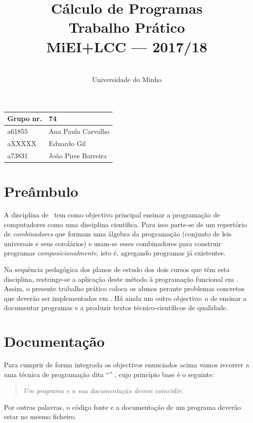 \documentclass[a4paper]{article}
\title{
       	    Cálculo de Programas
\\
       	Trabalho Prático
\\
       	MiEI+LCC --- 2017/18
}
\author{
       	\dium
\\
       	Universidade do Minho
}
\date\mydate
\begin{document}
\maketitle

\begin{center}\large
\begin{tabular}{ll}
\textbf{Grupo} nr. & 74
\\\hline
a61855 & Ana Paula Carvalho
\\
aXXXXX & Eduardo Gil
\\
a73831 & João Pires Barreira		
\end{tabular}
\end{center}

\section{Preâmbulo}

A disciplina de \CP\ tem como objectivo principal ensinar
a progra\-mação de computadores como uma disciplina científica. Para isso
parte-se de um repertório de \emph{combinadores} que formam uma álgebra da
programação (conjunto de leis universais e seus corolários) e usam-se esses
combinadores para construir programas \emph{composicionalmente}, isto é,
agregando programas já existentes.
  
Na sequência pedagógica dos planos de estudo dos dois cursos que têm esta
disciplina, restringe-se a aplicação deste método à programação funcional
em \Haskell. Assim, 
o presente trabalho prático coloca os alunos perante problemas
concretos que deverão ser implementados em \Haskell.
Há ainda um outro objectivo: o de ensinar a documentar programas e
a produzir textos técnico-científicos de qualidade.

\section{Documentação}
Para cumprir de forma integrada os objectivos enunciados acima vamos recorrer
a uma técnica de programa\-ção dita ``'' \cite{Kn92}, cujo
princípio base é o seguinte:
\begin{quote}\em
Um programa e a sua documentação devem coincidir.
\end{quote}
Por outras palavras, o código fonte e a documentação de um programa deverão estar no
mesmo ficheiro.
\end{document}
